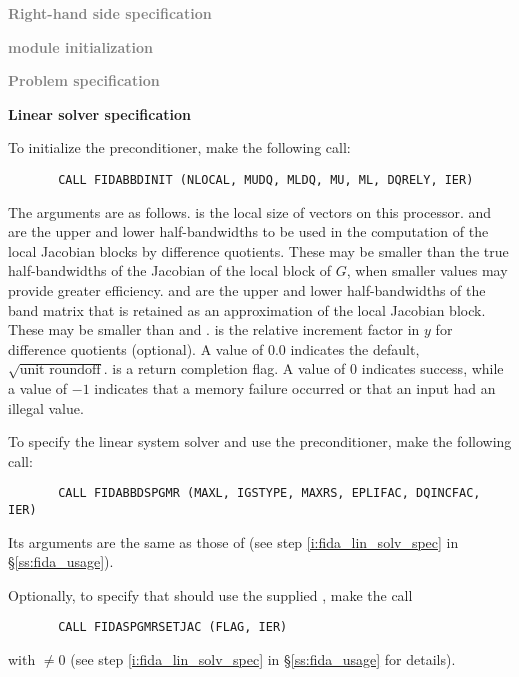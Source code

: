 \begin{Steps}
  
\item \textcolor{gray}{\bf Right-hand side specification}

\item \textcolor{gray}{\bf {\nvector} module initialization}

\item \textcolor{gray}{\bf Problem specification}

\item {\bf Linear solver specification}

  To initialize the {\idabbdpre} preconditioner, make the following call:
\begin{verbatim}
       CALL FIDABBDINIT (NLOCAL, MUDQ, MLDQ, MU, ML, DQRELY, IER)
\end{verbatim}
  The arguments are as follows.
   is the local size of vectors on this processor.
   and  are the upper and lower half-bandwidths to be used in 
  the computation of the local Jacobian blocks by difference quotients.
  These may be smaller than the true half-bandwidths of the
  Jacobian of the local block of $G$, when smaller values may
  provide greater efficiency.
   and  are the upper and lower half-bandwidths of the band matrix
  that  is retained as an approximation of the local Jacobian block.
  These may be smaller than  and .
   is the relative increment factor in $y$ for difference quotients
  (optional). A value of $0.0$ indicates the default, $\sqrt{\text{unit roundoff}}$.
   is a return completion flag.  A value of $0$ indicates success, while
  a value of $-1$ indicates that a memory failure occurred or that an input had
  an illegal value.

  To specify the {\spgmr} linear system solver and use the {\idabbdpre}
  preconditioner, make the following call:
\begin{verbatim}
       CALL FIDABBDSPGMR (MAXL, IGSTYPE, MAXRS, EPLIFAC, DQINCFAC, IER)
\end{verbatim}
  Its arguments are the same as those of 
  (see step \ref{i:fida_lin_solv_spec} in \S\ref{ss:fida_usage}).

  Optionally, to specify that {\spgmr} should use the supplied , 
  make the call
\begin{verbatim}
       CALL FIDASPGMRSETJAC (FLAG, IER)
\end{verbatim}
  with  $\neq 0$ 
  (see step \ref{i:fida_lin_solv_spec} in \S\ref{ss:fida_usage} for details).


\end{Steps}
